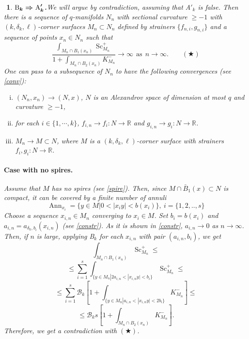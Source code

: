 \documentclass{article}
\def\RR{\mathbb{R}}
\def\cB{{\mathcal B}}
\def\ge{\geqslant}
\def\le{\leqslant}
\def\i{\subset}
\def\l{\left}
\def\r{\right}
\def\Sc{\operatorname{Sc}}
\newtheorem{Nothing}[thm]{$\!\!\!$}
\newenvironment{nothing}{\begin{Nothing}\rm}{\end{Nothing}}
\begin{document}
\begin{nothing}{\bf$\boldmath{\text{B}_{k} \Rightarrow\text{A}'_k}$.}\label{BtoA}
We will argue by contradiction,
assuming that A$'_k$ is false.
Then there is a sequence of $q$-manifolds $N_n$ with sectional curvature $\ge -1$
with $(k,\delta_k,\ell)$-corner surfaces $M_n\i N_n$ defined by strainers $\{f_{n,i},g_{n,i}\}$
and a sequence of points $x_n\in N_n$ such that
$$\frac{\int_{M_n\cap B_1(x_n)}\Sc^+_{M_n}}{1+\int_{M_n\cap B_2(x_n)}K^-_{M_n}}\to\infty \ \ \mbox{as}\ \ n\to\infty.\qquad(\bigstar)$$
One can pass to a subsequence of $N_n$ to have the following convergences (see \ref{conv}):

\begin{enumerate}[(i)]
\item $(N_n,x_n)\to (N,x)$, $N$ is an Alexandrov space of dimension at most $q$ and curvature $\ge -1$,
\item  for each $i\in \{1,\cdots,k\}$, $f_{i,n}\to f_i:N\to \RR$ and $g_{i,n}\to g_i:N\to \RR$.
\item $M_n\to M\i N$, where $M$ is a $(k,\delta_k,\ell)$-corner surface with strainers $f_i,g_i:N\to \RR$.
\end{enumerate}

\paragraph*{Case with no spires.} Assume that $M$ has no spires (see \ref{spire}).
Then, since $M\cap \bar B_1(x)\i N$ is compact, it can be covered by
a finite number of annuli
$$\operatorname{Ann}_{x_i}=\{y\in M|0<|x_i y|<b(x_i)\}, \ i=\{1,2,..,s\}$$
Choose a sequence $x_{i,n}\in M_n$ converging to $x_i\in M$.
Set $b_i=b(x_i)$ and $a_{i,n}=a_{\delta_k,b_i}(x_{i,n})$ (see \ref{constr}).
As it is shown in \ref{constr}, $a_{i,n}\to 0$ as $n\to\infty$.
Then, if $n$ is large, applying B$_k$ for each $x_{i,n}$ with pair $(a_{i,n},b_i)$, we get
$$\int_{M_n\cap B_1(x_n)} \Sc^+_{M_n}
\le$$
$$\le
\sum_{i=1}^s
\int_{\{y\in M_n|2a_{i,n}<|x_{i,n}y|<b_i\}} \Sc^+_{M_n}\le$$
$$\le\sum_{i=1}^s
\cB_k\l[1+\int_{\{y\in M_n|a_{i,n}<|x_{i,n}y|<2b_i\}} K^-_{M_n}\r]\le$$ $$\le \cB_k s\l[1+\int_{M_n\cap B_2(x_n)} K^-_{M_n}\r].$$
Therefore, we get a contradiction with $(\bigstar)$.


\end{nothing}
\end{document}
